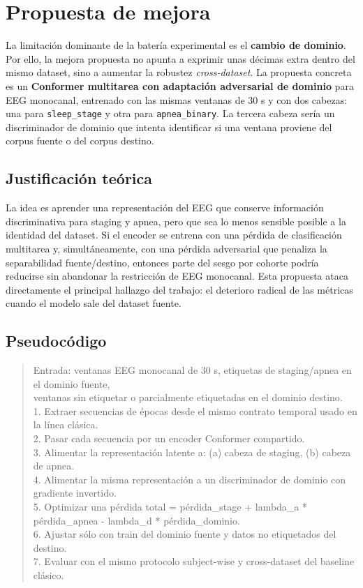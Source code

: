\section{Propuesta de mejora}

La limitaci\'on dominante de la bater\'ia experimental es el \textbf{cambio de dominio}. Por ello, la mejora propuesta no apunta a exprimir unas d\'ecimas extra dentro del mismo dataset, sino a aumentar la robustez \emph{cross-dataset}. La propuesta concreta es un \textbf{Conformer multitarea con adaptaci\'on adversarial de dominio} para EEG monocanal, entrenado con las mismas ventanas de 30 s y con dos cabezas: una para \texttt{sleep\_stage} y otra para \texttt{apnea\_binary}. La tercera cabeza ser\'ia un discriminador de dominio que intenta identificar si una ventana proviene del corpus fuente o del corpus destino.

\subsection{Justificaci\'on te\'orica}

La idea es aprender una representaci\'on del EEG que conserve informaci\'on discriminativa para staging y apnea, pero que sea lo menos sensible posible a la identidad del dataset. Si el encoder se entrena con una p\'erdida de clasificaci\'on multitarea y, simult\'aneamente, con una p\'erdida adversarial que penaliza la separabilidad fuente/destino, entonces parte del sesgo por cohorte podr\'ia reducirse sin abandonar la restricci\'on de EEG monocanal. Esta propuesta ataca directamente el principal hallazgo del trabajo: el deterioro radical de las m\'etricas cuando el modelo sale del dataset fuente.

\subsection{Pseudoc\'odigo}

\begin{quote}
\ttfamily
Entrada: ventanas EEG monocanal de 30 s, etiquetas de staging/apnea en el dominio fuente,\\
ventanas sin etiquetar o parcialmente etiquetadas en el dominio destino.\\[4pt]
1. Extraer secuencias de \'epocas desde el mismo contrato temporal usado en la l\'inea cl\'asica.\\
2. Pasar cada secuencia por un encoder Conformer compartido.\\
3. Alimentar la representaci\'on latente a: (a) cabeza de staging, (b) cabeza de apnea.\\
4. Alimentar la misma representaci\'on a un discriminador de dominio con gradiente invertido.\\
5. Optimizar una p\'erdida total = p\'erdida\_stage + lambda\_a * p\'erdida\_apnea - lambda\_d * p\'erdida\_dominio.\\
6. Ajustar s\'olo con train del dominio fuente y datos no etiquetados del destino.\\
7. Evaluar con el mismo protocolo subject-wise y cross-dataset del baseline cl\'asico.
\end{quote}

